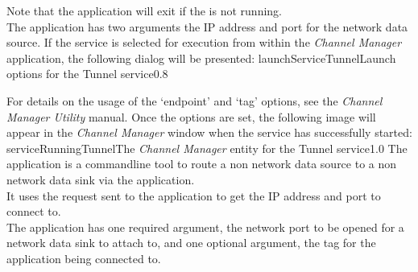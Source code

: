 Note that the application will exit if the
 is not running.\\

The application has two arguments \longDash{} the IP address and port for the network data
source.
\insertAutoAppParameters
{}
\condPage
If the service is selected for execution from within the \emph{Channel Manager}
application, the following dialog will be presented:
%
{launchServiceTunnel}{Launch options for the Tunnel service}{0.8}

For details on the usage of the `endpoint' and `tag' options, see the \emph{Channel
Manager Utility} manual.
Once the options are set, the following image will appear in the \emph{Channel Manager}
window when the service has successfully started:
%
{serviceRunningTunnel}{The \emph{Channel Manager} entity for the Tunnel service}{1.0}
\condPage
{}
The  application is a command\longDash{}line tool to route a
non\longDash\yarp{} network data source to a non\longDash\yarp{} network data sink via
the  application.\\

It uses the  request sent to the
 application to get the IP address and port to connect
to.\\

The application has one required argument, the network port to be opened for a network
data sink to attach to, and one optional argument, the tag for the
 application being connected to.
\insertShortClientParameters
{}
\secondaryEnd
\primaryEnd{}
